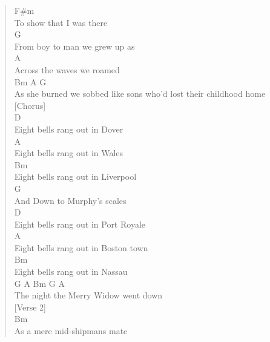 \documentclass[11pt]{article}
\begin{document}
\begin{verse}
\hspace*{3em}F\#m\\
To show that I was there\\
\hspace*{5em}G\\
From boy to man we grew up as\\
\hspace*{1em}A\\
Across the waves we roamed\\
Bm               A                      G\\
As she burned we sobbed like sons who'd lost their childhood home\\
\vspace*{1em}
\vspace*{1em}
[Chorus]\\
\vspace*{1em}
\hspace*{7em}D\\
Eight bells rang out in Dover\\
\hspace*{7em}A\\
Eight bells rang out in Wales\\
\hspace*{7em}Bm\\
Eight bells rang out in Liverpool\\
\hspace*{5em}G\\
And Down to Murphy's scales\\
\hspace*{7em}D\\
Eight bells rang out in Port Royale\\
\hspace*{7em}A\\
Eight bells rang out in Boston town\\
\hspace*{7em}Bm\\
Eight bells rang out in Nassau\\
\hspace*{5em}G               A          Bm      G   A\\
The night the Merry Widow went down\\
\vspace*{1em}
\vspace*{1em}
[Verse 2]\\
\vspace*{1em}
Bm\\
As a mere mid-shipmans mate\\

\end{verse}
\end{document}
